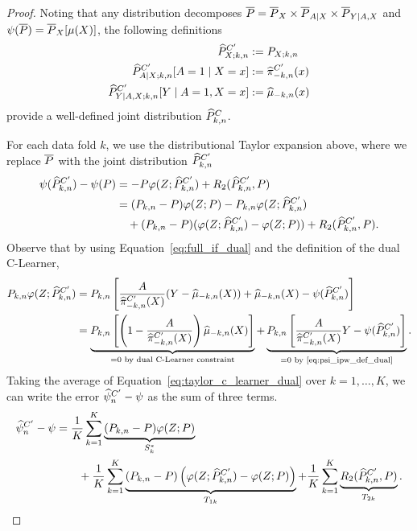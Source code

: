 \begin{proof}
Noting that any distribution decomposes $\overline{P}=\overline{P}_X\times \overline{P}_{A\mid X}\times \overline{P}_{Y\mid A,X}$ and $\psi(\overline{P})=\overline{P}_X[\mu(X)]$, the following definitions
\begin{align*}
\widehat{P}^{C'}_{X;k,n}&:=P_{X;k,n} \\
\widehat{P}^{C'}_{A\mid X ;k,n}[A=1\mid X=x]&:=\widehat{\pi}_{-k,n}^{C'}(x) \\ 
\widehat{P}^{C'}_{Y\mid A,X ;k,n}[Y\mid A=1, X=x]&:=\widehat{\mu}_{-k,n}(x)
\end{align*}
provide a well-defined joint distribution  $\widehat{P}^C_{k,n}$.

For each data fold $k$, we use the distributional Taylor expansion above, where we replace $\overline{P}$ with the joint distribution $\widehat{P}^{C'}_{k,n}$
\begin{align}
\label{eq:taylor_c_learner_dual}
\psi(\widehat{P}^{C'}_{k,n}) - \psi(P) &= - P \varphi(Z;\widehat{P}^{C'}_{k,n}) + R_2(\widehat{P}^{C'}_{k,n},P) \nonumber\\ 
&= (P_{k,n}-P)\varphi(Z;P)\nonumber
-P_{k,n} \varphi(Z;\widehat{P}^{C'}_{k,n})
\\&\quad  +(P_{k,n}-P)
(\varphi(Z;\widehat{P}^{C'}_{k,n})-\varphi(Z;P))
+R_2(\widehat{P}^{C'}_{k,n},P). 
\end{align}
Observe that by using Equation~\eqref{eq:full_if_dual} and the definition of the dual C-Learner,
\begin{align*}
    P_{k,n}\varphi(Z;\widehat{P}^{C'}_{k,n})
&=P_{k,n}\left[\frac{A}{\widehat{\pi}_{-k,n}^{C'}(X)}(Y-\widehat{\mu}_{-k,n}(X))+\widehat{\mu}_{-k,n}(X)-\psi(\widehat{P}^{C'}_{k,n})\right]
\\&=
\underbrace{
P_{k,n}\left[\left(1-\frac{A}{\widehat{\pi}_{-k,n}^{C'}(X)}\right)
\widehat{\mu}_{-k,n}(X)\right]}_{=0\text{ by dual C-Learner constraint}}
+\underbrace{P_{k,n}\left[\frac{A}{\widehat{\pi}_{-k,n}^{C'}(X)}Y
-\psi(\widehat{P}^{C'}_{k,n})
\right]}_{=0\text{ by \eqref{eq:psi_ipw_def_dual}}}.
\end{align*}
Taking the average of Equation~\eqref{eq:taylor_c_learner_dual} over $k=1,\ldots,K$,
we can write the error $\widehat{\psi}^{C'}_n-\psi$ as the sum of three terms.
    \begin{align}   
     \widehat{\psi}^{C'}_{n} - \psi  
    & = \frac{1}{K}\sum_{k=1}^K\underbrace{(P_{k,n}-P)\varphi(Z;P)}_{S^*_k} \nonumber \\
    &  \qquad + \frac{1}{K}\sum_{k=1}^K\underbrace{(P_{k,n}-P) \left(\varphi(Z;\widehat{P}^{C'}_{k,n})-\varphi(Z;P)\right)}_{T_{1k}} + \frac{1}{K}\sum_{k=1}^K\underbrace{R_2(\widehat{P}^{C'}_{k,n},P)}_{T_{2k}}. \label{eq:S+T1+T2_dual}
\end{align}

\end{proof}
